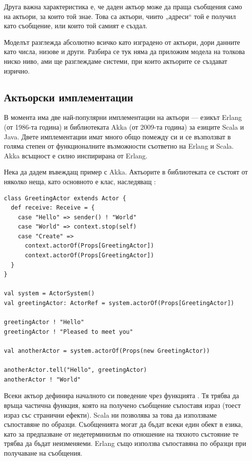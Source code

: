 Друга важна характеристика е, че даден актьор може да праща съобщения само на актьори, за които той знае. Това са актьори, чиито „адреси“ той е получил като съобщение, или които той самият е създал.

Моделът разглежда абсолютно всичко като изградено от актьори, дори данните като числа, низове и други. Разбира се тук няма да приложим модела на толкова ниско ниво, ами ще разглеждаме системи, при които актьорите се създават изрично.

\subsection{Актьорски имплементации}

В момента има две най-популярни имплементации на актьори — езикът Erlang (от 1986-та година) и библиотеката Akka (от 2009-та година) за езиците Scala и Java. Двете имплементации имат много общо помежду си и се възползват в голяма степен от функционалните възможности съответно на Erlang и Scala. Akka всъщност е силно инспирирана от Erlang.

Нека да дадем въвеждащ пример с Akka. Актьорите в библиотеката се състоят от няколко неща, като основното е клас, наследяващ :

\begin{lstlisting}[style=listing]
class GreetingActor extends Actor {
  def receive: Receive = {
    case "Hello" => sender() ! "World"
    case "World" => context.stop(self)
    case "Create" =>
      context.actorOf(Props[GreetingActor])
      context.actorOf(Props[GreetingActor])
  }
}

val system = ActorSystem()
val greetingActor: ActorRef = system.actorOf(Props[GreetingActor])

greetingActor ! "Hello"
greetingActor ! "Pleased to meet you"

val anotherActor = system.actorOf(Props(new GreetingActor))

anotherActor.tell("Hello", greetingActor)
anotherActor ! "World"
\end{lstlisting}

Всеки актьор дефинира началното си поведение чрез функцията . Тя трябва да връща частична функция, която на получено съобщение съпоставя  израз (тоест израз със странични ефекти). Scala ни позволява за това да използваме съпоставяне по образци. Съобщенията могат да бъдат всеки един обект в езика, като за предпазване от недетерминизъм по отношение на тяхното състояние те трябва да бъдат неизменяеми. Erlang също използва съпоставяна по образци при получаване на съобщения.

